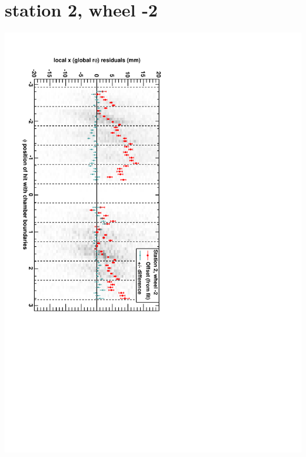 \documentclass[compress]{beamer}
\begin{document}
\section*{station 2, wheel -2}
\begin{frame} \vfill \mbox{\hspace{-1 cm}\includegraphics[height=1.2\linewidth, angle=90]{DTrphiVsPhi_st2_whA.pdf}} \end{frame}
\end{document}
